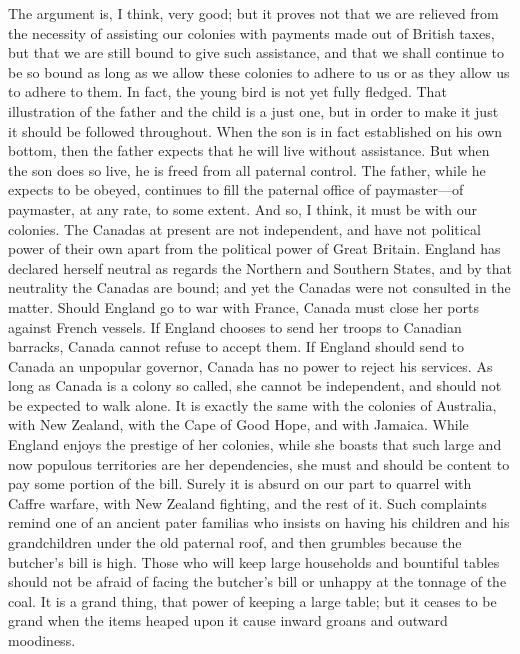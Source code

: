 The argument is, I think, very good; but it proves not that we are
relieved from the necessity of assisting our colonies with payments
made out of British taxes, but that we are still bound to give such
assistance, and that we shall continue to be so bound as long as we
allow these colonies to adhere to us or as they allow us to adhere
to them.  In fact, the young bird is not yet fully fledged.  That
illustration of the father and the child is a just one, but in
order to make it just it should be followed throughout.  When the
son is in fact established on his own bottom, then the father
expects that he will live without assistance.  But when the son
does so live, he is freed from all paternal control.  The father,
while he expects to be obeyed, continues to fill the paternal
office of paymaster---of paymaster, at any rate, to some extent.
And so, I think, it must be with our colonies.  The Canadas at
present are not independent, and have not political power of their
own apart from the political power of Great Britain.  England has
declared herself neutral as regards the Northern and Southern
States, and by that neutrality the Canadas are bound; and yet the
Canadas were not consulted in the matter.  Should England go to war
with France, Canada must close her ports against French vessels.
If England chooses to send her troops to Canadian barracks, Canada
cannot refuse to accept them.  If England should send to Canada an
unpopular governor, Canada has no power to reject his services.  As
long as Canada is a colony so called, she cannot be independent,
and should not be expected to walk alone.  It is exactly the same
with the colonies of Australia, with New Zealand, with the Cape of
Good Hope, and with Jamaica.  While England enjoys the prestige of
her colonies, while she boasts that such large and now populous
territories are her dependencies, she must and should be content to
pay some portion of the bill.  Surely it is absurd on our part to
quarrel with Caffre warfare, with New Zealand fighting, and the
rest of it.  Such complaints remind one of an ancient pater
familias who insists on having his children and his grandchildren
under the old paternal roof, and then grumbles because the
butcher's bill is high.  Those who will keep large households and
bountiful tables should not be afraid of facing the butcher's bill
or unhappy at the tonnage of the coal.  It is a grand thing, that
power of keeping a large table; but it ceases to be grand when the
items heaped upon it cause inward groans and outward moodiness.

